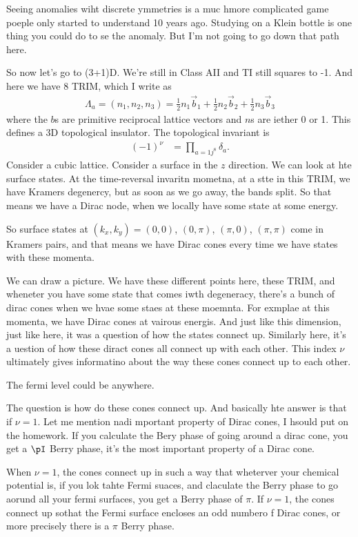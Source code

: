 Seeing anomalies wiht discrete ymmetries is a muc hmore complicated game poeple
only started to understand 10 years ago.
Studying on a Klein bottle is one thing you could do to se the anomaly.
But I'm not going to go down that path here.

So now let's go to (3+1)D.
We're still in Class AII and TI still squares to -1.
And here we have 8 TRIM,
which I write as
\begin{align}
    \Lambda_a=(n_1,n_2,n_3)
    =
    \frac{1}{2}n_1 \vec{b}_1
    + \frac{1}{2}n_2 \vec{b}_2
    + \frac{1}{2}n_3 \vec{b}_3
\end{align}
where the $b$s are primitive reciprocal lattice vectors and $n$s are iether 0 or
1.
This defines a 3D topological insulator.
The topological invariant is
\begin{align}
    (-1)^\nu &= \prod_{a=1j^{8}}\delta_a.
\end{align}
Consider a cubic lattice.
Consider a surface in the $z$ direction.
We can look at hte surface states.
At the time-reversal invaritn mometna,
at a stte in this TRIM,
we have Kramers degenercy,
but as soon as we go away,
the bands split.
So that means we have a Dirac node,
when we locally have some state at some energy.

So surface states at $(k_x,k_y)=(0,0)$, $(0,\pi)$, $(\pi, 0)$, $(\pi, \pi)$
come in Kramers pairs,
and that means we have Dirac cones every time we have states with these momenta.

We can draw a picture.
We have these different points here,
these TRIM,
and wheneter you have some state that comes iwth degeneracy,
there's a bunch of dirac cones when we hvae some staes at these moemnta.
For exmplae
at this momenta,
we have Dirac cones at vairous energis.
And just like this dimension,
just like here,
it was a question of how the states connect up.
Similarly here,
it's a uestion of how these diract cones all connect up with each other.
This index $\nu$ ultimately gives informatino about the way these cones connect
up to each other.

The fermi level could be anywhere.

The question is how do these cones connect up.
And basically hte answer is that if $\nu=1$.
Let me mention nadi mportant property of Dirac cones,
I hsould put on the homework.
If you calculate the Bery phase of going around a dirac cone,
you get a $\pI$ Berry phase,
it's the most important property of a Dirac cone.

When $\nu=1$,
the cones connect up in such a way that wheterver your chemical potential is,
if you lok tahte Fermi suaces,
and claculate the Berry phase to go aorund all your fermi surfaces,
you get a Berry phase of $\pi$.
If $\nu=1$,
the cones connect up sothat the Fermi surface encloses an odd numbero f Dirac
cones,
or more precisely there is a $\pi$ Berry phase.

